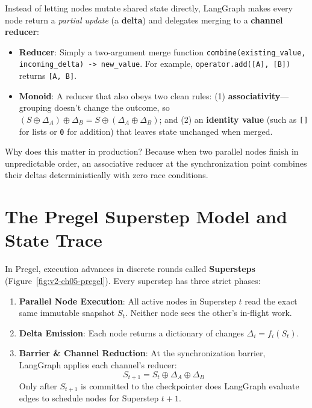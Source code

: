 Instead of letting nodes mutate shared state directly, LangGraph makes every node return a \emph{partial update} (a \textbf{delta}) and delegates merging to a \textbf{channel reducer}:
\begin{itemize}[leftmargin=18pt]
  \item \textbf{Reducer}: Simply a two-argument merge function \texttt{combine(existing\_value, incoming\_delta) -> new\_value}. For example, \texttt{operator.add([A], [B])} returns \texttt{[A, B]}.
  \item \textbf{Monoid}: A reducer that also obeys two clean rules: (1) \textbf{associativity}—grouping doesn't change the outcome, so $(S \oplus \Delta_A) \oplus \Delta_B = S \oplus (\Delta_A \oplus \Delta_B)$; and (2) an \textbf{identity value} (such as \texttt{[]} for lists or \texttt{0} for addition) that leaves state unchanged when merged.
\end{itemize}
Why does this matter in production? Because when two parallel nodes finish in unpredictable order, an associative reducer at the synchronization point combines their deltas deterministically with zero race conditions.

\section{The Pregel Superstep Model and State Trace}

In Pregel, execution advances in discrete rounds called \textbf{Supersteps} (Figure~\ref{fig:v2-ch05-pregel}). Every superstep has three strict phases:
\begin{enumerate}[leftmargin=18pt]
  \item \textbf{Parallel Node Execution}: All active nodes in Superstep $t$ read the exact same immutable snapshot $S_t$. Neither node sees the other's in-flight work.
  \item \textbf{Delta Emission}: Each node returns a dictionary of changes $\Delta_i = f_i(S_t)$.
  \item \textbf{Barrier \& Channel Reduction}: At the synchronization barrier, LangGraph applies each channel's reducer:
  \begin{equation}
  S_{t+1} = S_t \oplus \Delta_A \oplus \Delta_B
  \end{equation}
  Only after $S_{t+1}$ is committed to the checkpointer does LangGraph evaluate edges to schedule nodes for Superstep $t+1$.
\end{enumerate}

